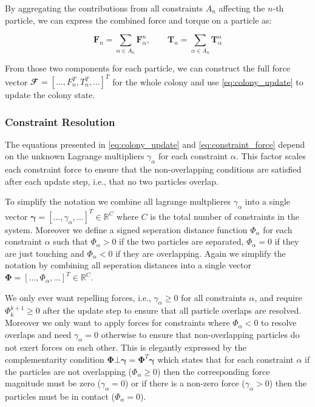\documentclass[conference]{IEEEtran}
\begin{document}
By aggregating the contributions from all constraints $A_n$ affecting the $n$-th particle, we can express the combined force and torque on a particle as:

$$
    \mathbf{F}_n = \sum_{\alpha \in A_n} \mathbf{F}_\alpha^n, \qquad \mathbf{T}_n = \sum_{\alpha \in A_n} \mathbf{T}_\alpha^n
$$
\label{eq:total_force}

From those two components for each particle, we can construct the full force vector $\mathbfcal{F} = [ \dots, F_n^T, T_n^T, \dots]^T$ for the whole colony and use \autoref{eq:colony_update} to update the colony state.


\subsubsection{Constraint Resolution}

The equations presented in \autoref{eq:colony_update} and \autoref{eq:constraint_force} depend on the unknown Lagrange multipliers $\gamma_\alpha$ for each constraint $\alpha$. This factor scales each constraint force to ensure that the non-overlapping conditions are satisfied after each update step, i.e., that no two particles overlap.

To simplify the notation we combine all lagrange multplieres $\gamma_\alpha$ into a single vector $\mathbf{\gamma} = [\dots, \gamma_\alpha, \dots]^T \in \mathbb{R}^{C}$ where $C$ is the total number of constraints in the system. Moreover we define a signed seperation distance function $\Phi_{\alpha}$ for each constraint $\alpha$ such that $\Phi_{\alpha} > 0$ if the two particles are separated, $\Phi_{\alpha} = 0$ if they are just touching and $\Phi_{\alpha} < 0$ if they are overlapping. Again we simplify the notation by combining all seperation distances into a single vector $\mathbf{\Phi} = [\dots, \Phi_\alpha, \dots]^T \in \mathbb{R}^{C}$.


We only ever want repelling forces, i.e., $\gamma_\alpha \geq 0$ for all constraints $\alpha$, and require $\Phi_{k}^{k+1} \geq 0$ after the update step to ensure that all particle overlaps are resolved. Moreover we only want to apply forces for constraints where $\Phi_{\alpha} < 0$ to resolve overlaps and need $\gamma_\alpha = 0$ otherwise to ensure that non-overlapping particles do not exert forces on each other. This is elegantly expressed by the complementarity condition $\mathbf{\Phi} \bot \mathbf{\gamma} = \mathbf{\Phi}^T \mathbf{\gamma}$ which states that for each constraint $\alpha$ if the particles are not overlapping ($\Phi_\alpha \geq 0$) then the corresponding force magnitude must be zero ($\gamma_\alpha = 0$) or if there is a non-zero force ($\gamma_\alpha > 0$) then the particles must be in contact ($\Phi_\alpha = 0$).
\end{document}
